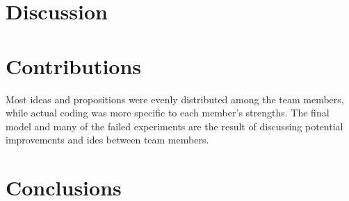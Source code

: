 \documentclass[11pt]{article}
\begin{document}
\begin{multicols}{2}
      \section{Discussion}


      \section{Contributions}

      Most ideas and propositions were evenly distributed among the team members, while actual coding was more specific to each member's strengths. The final model and many of the failed experiments are the result of discussing potential improvements and ides between team members.

      \section{Conclusions}


      
      

\end{multicols}
\end{document}
